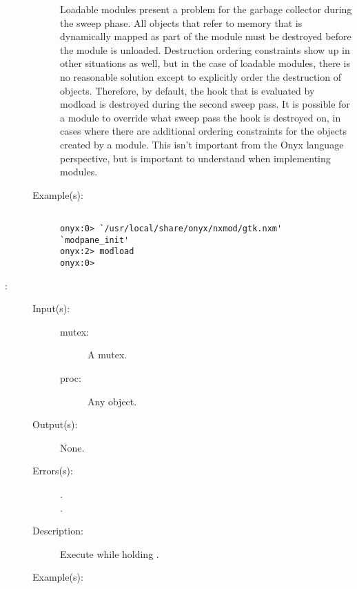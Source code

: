 \begin{description}
\begin{description}
		Loadable modules present a problem for the garbage collector
		during the sweep phase.  All objects that refer to memory that
		is dynamically mapped as part of the module must be destroyed
		before the module is unloaded.  Destruction ordering constraints
		show up in other situations as well, but in the case of loadable
		modules, there is no reasonable solution except to explicitly
		order the destruction of objects.  Therefore, by default, the
		hook that is evaluated by modload is destroyed during the second
		sweep pass.  It is possible for a module to override what sweep
		pass the hook is destroyed on, in cases where there are
		additional ordering constraints for the objects created by a
		module.  This isn't important from the Onyx language
		perspective, but is important to understand when implementing
		modules.
	\item[Example(s): ]\begin{verbatim}

onyx:0> `/usr/local/share/onyx/nxmod/gtk.nxm' `modpane_init'
onyx:2> modload
onyx:0>
	\end{verbatim}
	\end{description}
\label{systemdict:monitor}
\item[{\onyxop{mutex proc}{monitor}{--}}: ]
	\begin{description}\item[]
	\item[Input(s): ]
		\begin{description}\item[]
		\item[mutex: ]
			A mutex.
		\item[proc: ]
			Any object.
		\end{description}
	\item[Output(s): ] None.
	\item[Errors(s): ]
		\begin{description}\item[]
		\item[.]
		\item[.]
		\end{description}
	\item[Description: ]
		Execute  while holding .
	\item[Example(s): ]\begin{verbatim}


\end{verbatim}
\end{description}
\end{description}
